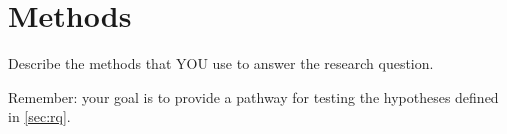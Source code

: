 \chapter{Methods}
\label{ch:methods}

Describe the methods that YOU use to answer the research question.


Remember: your goal is to provide a pathway for testing the hypotheses defined in \autoref{sec:rq}.
